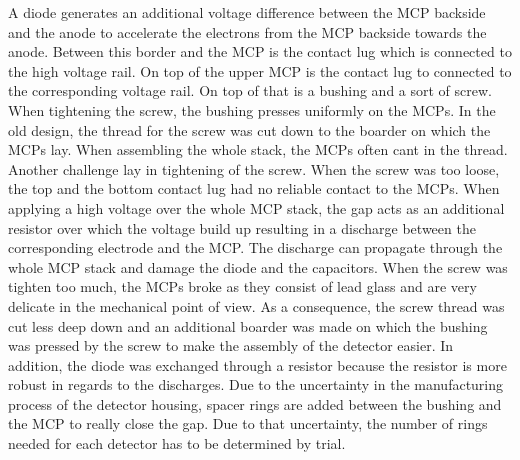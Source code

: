 	A diode generates an additional voltage difference between the MCP backside and the anode to accelerate the electrons from the MCP backside towards the anode. Between this border and the MCP is the contact lug which is connected to the high voltage rail. On top of the upper MCP is the contact lug to connected to the corresponding voltage rail. On top of that is a bushing and a sort of screw. When tightening the screw, the bushing presses uniformly on the MCPs. In the old design, the thread for the screw was cut down to the boarder on which the MCPs lay. When assembling the whole stack, the MCPs often cant in the thread. Another challenge lay in tightening of the screw. When the screw was too loose, the top and the bottom contact lug had no reliable contact to the MCPs. When applying a high voltage over the whole MCP stack, the gap acts as an additional resistor over which the voltage build up resulting in a discharge between the corresponding electrode and the MCP. The discharge can propagate through the whole MCP stack and damage the diode and the capacitors. When the screw was tighten too much, the MCPs broke as they consist of lead glass and are very delicate in the mechanical point of view. As a consequence, the screw thread was cut less deep down and an additional boarder was made on which the bushing was pressed by the screw to make the assembly of the detector easier. In addition, the diode was exchanged through a resistor because the resistor is more robust in regards to the discharges. Due to the uncertainty in the manufacturing process of the detector housing, spacer rings are added between the bushing and the MCP to really close the gap. Due to that uncertainty, the number of rings needed for each detector has to be determined by trial.
	
